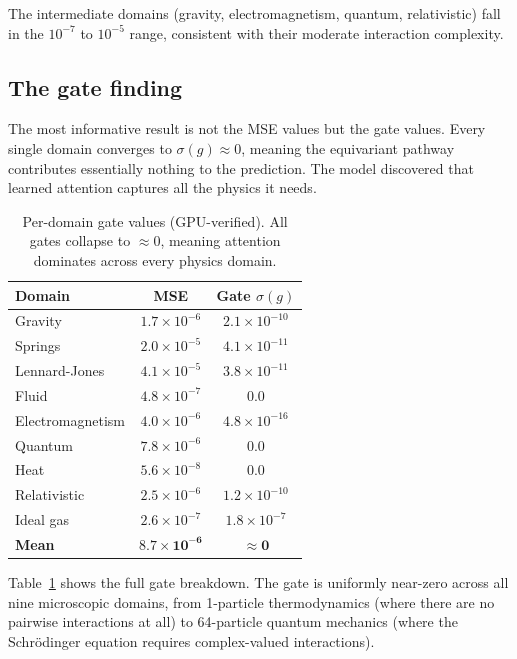 \documentclass[10pt,twocolumn]{article}
\begin{document}
The intermediate domains (gravity, electromagnetism, quantum, relativistic) fall in the $10^{-7}$ to $10^{-5}$ range, consistent with their moderate interaction complexity.

\subsection{The gate finding}

The most informative result is not the MSE values but the gate values. Every single domain converges to $\sigma(g) \approx 0$, meaning the equivariant pathway contributes essentially nothing to the prediction. The model discovered that learned attention captures all the physics it needs.

\begin{table}[ht]
\centering
\caption{Per-domain gate values (GPU-verified). All gates collapse to $\approx 0$, meaning attention dominates across every physics domain.}
\label{tab:gates}
\small
\begin{tabular}{@{}lcc@{}}
\toprule
Domain & MSE & Gate $\sigma(g)$ \\
\midrule
Gravity & $1.7 \times 10^{-6}$ & $2.1 \times 10^{-10}$ \\
Springs & $2.0 \times 10^{-5}$ & $4.1 \times 10^{-11}$ \\
Lennard-Jones & $4.1 \times 10^{-5}$ & $3.8 \times 10^{-11}$ \\
Fluid & $4.8 \times 10^{-7}$ & $0.0$ \\
Electromagnetism & $4.0 \times 10^{-6}$ & $4.8 \times 10^{-16}$ \\
Quantum & $7.8 \times 10^{-6}$ & $0.0$ \\
Heat & $5.6 \times 10^{-8}$ & $0.0$ \\
Relativistic & $2.5 \times 10^{-6}$ & $1.2 \times 10^{-10}$ \\
Ideal gas & $2.6 \times 10^{-7}$ & $1.8 \times 10^{-7}$ \\
\midrule
\textbf{Mean} & $\mathbf{8.7 \times 10^{-6}}$ & $\mathbf{\approx 0}$ \\
\bottomrule
\end{tabular}
\end{table}

Table~\ref{tab:gates} shows the full gate breakdown. The gate is uniformly near-zero across all nine microscopic domains, from 1-particle thermodynamics (where there are no pairwise interactions at all) to 64-particle quantum mechanics (where the Schr\"{o}dinger equation requires complex-valued interactions).
\end{document}
